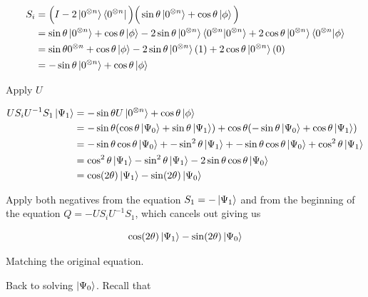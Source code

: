 \documentclass[11pt]{article}
\newcommand{\sinth}{\sin\theta}
\newcommand{\costh}{\cos\theta}
\newcommand{\ztimesn}{0^{\otimes n}}
\begin{document}
\begin{enumerate}
\begin{enumerate}
		            \begin{align*}
			            S_i & = \Big(I - 2 \ket{0^{\otimes n}}\bra{0^{\otimes n}}\Big) \Big(\sin\theta\ket{0^{\otimes n}} + \cos\theta\ket{\phi}\Big)                           \\
			                & = \sinth \ket{\ztimesn} + \costh \ket{\phi} - 2\sinth\ket{\ztimesn}\braket{\ztimesn | \ztimesn}+ 2 \costh \ket{\ztimesn} \braket{\ztimesn | \phi} \\
			                & = \sinth \ztimesn + \costh \ket{\phi} - 2 \sinth \ket{\ztimesn} (1) + 2 \costh \ket{\ztimesn} (0)                                                 \\
			                & = -\sinth \ket{\ztimesn} + \costh \ket{\phi}
		            \end{align*}

		            Apply $U$

		            \begin{align*}
			            US_iU^{-1}S_1\ket{\Psi_1} & = -\sinth U \ket{\ztimesn} + \costh \ket{\phi}                                                                 \\
			                                      & = -\sinth (\costh \ket{\Psi_0} + \sinth \ket{\Psi_1})  + \costh(-\sinth\ket{\Psi_0} + \costh\ket{\Psi_1})      \\
			                                      & = -\sinth\costh\ket{\Psi_0} + -\sin^2\theta\ket{\Psi_1} + -\sinth\costh\ket{\Psi_0} + \cos^2\theta\ket{\Psi_1} \\
			                                      & = \cos^2\theta\ket{\Psi_1} - \sin^2\theta\ket{\Psi_1} - 2\sinth\costh\ket{\Psi_0}                              \\
			                                      & = \cos(2\theta)\ket{\Psi_1} - \sin(2\theta)\ket{\Psi_0}
		            \end{align*}

		            Apply both negatives from the equation $S_1 = -\ket{\Psi_1}$ and from the beginning of the equation $Q = -US_iU^{-1}S_1$, which cancels out giving us

		            \begin{equation*}
			            \cos(2\theta)\ket{\Psi_1} - \sin(2\theta)\ket{\Psi_0}
		            \end{equation*}

		            Matching the original equation.

		            Back to solving $\ket{\Psi_0}$. Recall that


\end{enumerate}
\end{enumerate}
\end{document}
